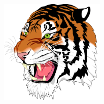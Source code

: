 \documentclass{article}
\begin{document}
\begin{center}
  \includegraphics[width = 5cm, angle = 45]{Ghostscript_Tiger-512px}
\end{center}
\end{document}
